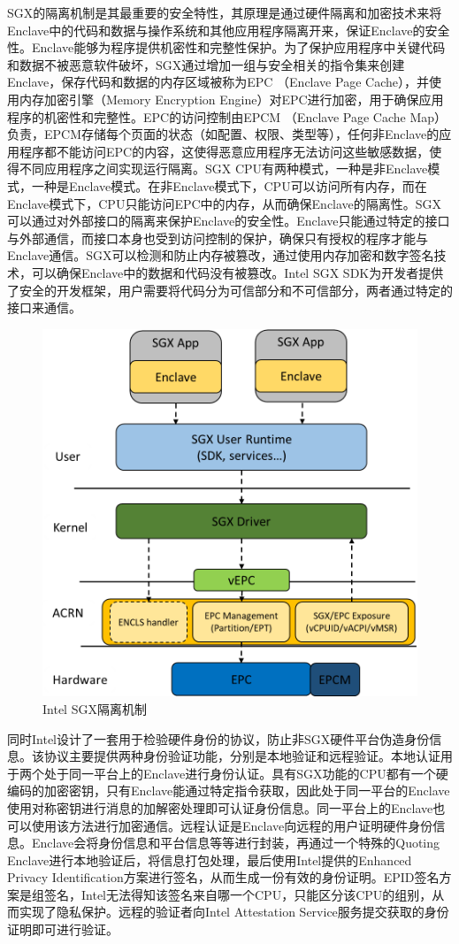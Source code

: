 \documentclass[twocolumn]{source/Paper}
\begin{document}
    
    SGX的隔离机制是其最重要的安全特性，其原理是通过硬件隔离和加密技术来将Enclave中的代码和数据与操作系统和其他应用程序隔离开来，保证Enclave的安全性。Enclave能够为程序提供机密性和完整性保护。为了保护应用程序中关键代码和数据不被恶意软件破坏，SGX通过增加一组与安全相关的指令集来创建Enclave，保存代码和数据的内存区域被称为EPC （Enclave Page Cache），并使用内存加密引擎（Memory Encryption Engine）对EPC进行加密，用于确保应用程序的机密性和完整性。EPC的访问控制由EPCM （Enclave Page Cache Map）负责，EPCM存储每个页面的状态（如配置、权限、类型等），任何非Enclave的应用程序都不能访问EPC的内容，这使得恶意应用程序无法访问这些敏感数据，使得不同应用程序之间实现运行隔离。SGX CPU有两种模式，一种是非Enclave模式，一种是Enclave模式。在非Enclave模式下，CPU可以访问所有内存，而在Enclave模式下，CPU只能访问EPC中的内存，从而确保Enclave的隔离性。SGX可以通过对外部接口的隔离来保护Enclave的安全性。Enclave只能通过特定的接口与外部通信，而接口本身也受到访问控制的保护，确保只有授权的程序才能与Enclave通信。SGX可以检测和防止内存被篡改，通过使用内存加密和数字签名技术，可以确保Enclave中的数据和代码没有被篡改。Intel SGX SDK为开发者提供了安全的开发框架，用户需要将代码分为可信部分和不可信部分，两者通过特定的接口来通信。

    \begin{figure}[H]
        \centering
        \includegraphics[width=0.4\linewidth]{pic/sgx.png}
        \caption{Intel SGX隔离机制}
        \label{sgx}
    \end{figure}


    同时Intel设计了一套用于检验硬件身份的协议，防止非SGX硬件平台伪造身份信息。该协议主要提供两种身份验证功能，分别是本地验证和远程验证。本地认证用于两个处于同一平台上的Enclave进行身份认证。具有SGX功能的CPU都有一个硬编码的加密密钥，只有Enclave能通过特定指令获取，因此处于同一平台的Enclave使用对称密钥进行消息的加解密处理即可认证身份信息。同一平台上的Enclave也可以使用该方法进行加密通信。远程认证是Enclave向远程的用户证明硬件身份信息。Enclave会将身份信息和平台信息等等进行封装，再通过一个特殊的Quoting Enclave进行本地验证后，将信息打包处理，最后使用Intel提供的Enhanced Privacy Identification方案进行签名，从而生成一份有效的身份证明。EPID签名方案是组签名，Intel无法得知该签名来自哪一个CPU，只能区分该CPU的组别，从而实现了隐私保护。远程的验证者向Intel Attestation Service服务提交获取的身份证明即可进行验证。
\end{document}
